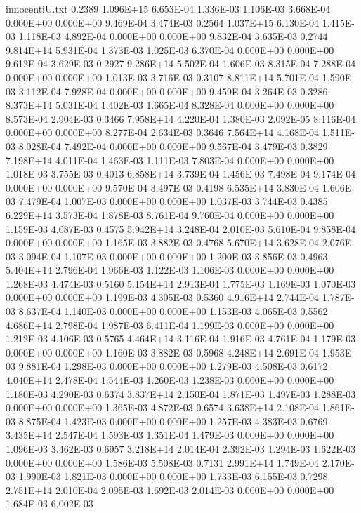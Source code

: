 \begin{filecontents}{innocentiU.txt}
0.2389 1.096E+15 6.653E-04 1.336E-03 1.106E-03 3.668E-04 0.000E+00 0.000E+00 9.469E-04 3.474E-03
0.2564 1.037E+15 6.130E-04 1.415E-03 1.118E-03 4.892E-04 0.000E+00 0.000E+00 9.832E-04 3.635E-03
0.2744 9.814E+14 5.931E-04 1.373E-03 1.025E-03 6.370E-04 0.000E+00 0.000E+00 9.612E-04 3.629E-03
0.2927 9.286E+14 5.502E-04 1.606E-03 8.315E-04 7.288E-04 0.000E+00 0.000E+00 1.013E-03 3.716E-03
0.3107 8.811E+14 5.701E-04 1.590E-03 3.112E-04 7.928E-04 0.000E+00 0.000E+00 9.459E-04 3.264E-03
0.3286 8.373E+14 5.031E-04 1.402E-03 1.665E-04 8.328E-04 0.000E+00 0.000E+00 8.573E-04 2.904E-03
0.3466 7.958E+14 4.220E-04 1.380E-03 2.092E-05 8.116E-04 0.000E+00 0.000E+00 8.277E-04 2.634E-03
0.3646 7.564E+14 4.168E-04 1.511E-03 8.028E-04 7.492E-04 0.000E+00 0.000E+00 9.567E-04 3.479E-03
0.3829 7.198E+14 4.011E-04 1.463E-03 1.111E-03 7.803E-04 0.000E+00 0.000E+00 1.018E-03 3.755E-03
0.4013 6.858E+14 3.739E-04 1.456E-03 7.498E-04 9.174E-04 0.000E+00 0.000E+00 9.570E-04 3.497E-03
0.4198 6.535E+14 3.830E-04 1.606E-03 7.479E-04 1.007E-03 0.000E+00 0.000E+00 1.037E-03 3.744E-03
0.4385 6.229E+14 3.573E-04 1.878E-03 8.761E-04 9.760E-04 0.000E+00 0.000E+00 1.159E-03 4.087E-03
0.4575 5.942E+14 3.248E-04 2.010E-03 5.610E-04 9.858E-04 0.000E+00 0.000E+00 1.165E-03 3.882E-03
0.4768 5.670E+14 3.628E-04 2.076E-03 3.094E-04 1.107E-03 0.000E+00 0.000E+00 1.200E-03 3.856E-03
0.4963 5.404E+14 2.796E-04 1.966E-03 1.122E-03 1.106E-03 0.000E+00 0.000E+00 1.268E-03 4.474E-03
0.5160 5.154E+14 2.913E-04 1.775E-03 1.169E-03 1.070E-03 0.000E+00 0.000E+00 1.199E-03 4.305E-03
0.5360 4.916E+14 2.744E-04 1.787E-03 8.637E-04 1.140E-03 0.000E+00 0.000E+00 1.153E-03 4.065E-03
0.5562 4.686E+14 2.798E-04 1.987E-03 6.411E-04 1.199E-03 0.000E+00 0.000E+00 1.212E-03 4.106E-03
0.5765 4.464E+14 3.116E-04 1.916E-03 4.761E-04 1.179E-03 0.000E+00 0.000E+00 1.160E-03 3.882E-03
0.5968 4.248E+14 2.691E-04 1.953E-03 9.881E-04 1.298E-03 0.000E+00 0.000E+00 1.279E-03 4.508E-03
0.6172 4.040E+14 2.478E-04 1.544E-03 1.260E-03 1.238E-03 0.000E+00 0.000E+00 1.180E-03 4.290E-03
0.6374 3.837E+14 2.150E-04 1.871E-03 1.497E-03 1.288E-03 0.000E+00 0.000E+00 1.365E-03 4.872E-03
0.6574 3.638E+14 2.108E-04 1.861E-03 8.875E-04 1.423E-03 0.000E+00 0.000E+00 1.257E-03 4.383E-03
0.6769 3.435E+14 2.547E-04 1.593E-03 1.351E-04 1.479E-03 0.000E+00 0.000E+00 1.096E-03 3.462E-03
0.6957 3.218E+14 2.014E-04 2.392E-03 1.294E-03 1.622E-03 0.000E+00 0.000E+00 1.586E-03 5.508E-03
0.7131 2.991E+14 1.749E-04 2.170E-03 1.990E-03 1.821E-03 0.000E+00 0.000E+00 1.733E-03 6.155E-03
0.7298 2.751E+14 2.010E-04 2.095E-03 1.692E-03 2.014E-03 0.000E+00 0.000E+00 1.684E-03 6.002E-03

\end{filecontents}
